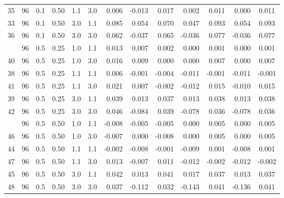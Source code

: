 \begin{longtable}[t]{ccccccrrrrrrc}
35 & 96 & 0.1 & 0.50 & 1.1 & 3.0 & 0.006 & -0.013 & 0.017 & 0.002 & 0.011 & 0.000 & 0.011\\
33 & 96 & 0.1 & 0.50 & 3.0 & 1.1 & 0.085 & 0.054 & 0.070 & 0.047 & 0.093 & 0.054 & 0.093\\
36 & 96 & 0.1 & 0.50 & 3.0 & 3.0 & 0.062 & -0.037 & 0.065 & -0.036 & 0.077 & -0.036 & 0.077\\
\addlinespace
37 & 96 & 0.5 & 0.25 & 1.0 & 1.1 & 0.013 & 0.007 & 0.002 & 0.000 & 0.001 & 0.000 & 0.001\\
40 & 96 & 0.5 & 0.25 & 1.0 & 3.0 & 0.016 & 0.009 & 0.000 & 0.000 & 0.007 & 0.000 & 0.007\\
38 & 96 & 0.5 & 0.25 & 1.1 & 1.1 & 0.006 & -0.001 & -0.004 & -0.011 & -0.001 & -0.011 & -0.001\\
41 & 96 & 0.5 & 0.25 & 1.1 & 3.0 & 0.021 & 0.007 & -0.002 & -0.012 & 0.015 & -0.010 & 0.015\\
39 & 96 & 0.5 & 0.25 & 3.0 & 1.1 & 0.039 & 0.013 & 0.037 & 0.013 & 0.038 & 0.013 & 0.038\\
42 & 96 & 0.5 & 0.25 & 3.0 & 3.0 & 0.046 & -0.084 & 0.039 & -0.078 & 0.036 & -0.078 & 0.036\\
\addlinespace
43 & 96 & 0.5 & 0.50 & 1.0 & 1.1 & -0.008 & -0.005 & -0.005 & 0.000 & 0.005 & 0.000 & 0.005\\
46 & 96 & 0.5 & 0.50 & 1.0 & 3.0 & -0.007 & 0.000 & -0.008 & 0.000 & 0.005 & 0.000 & 0.005\\
44 & 96 & 0.5 & 0.50 & 1.1 & 1.1 & -0.002 & -0.008 & -0.001 & -0.009 & 0.001 & -0.008 & 0.001\\
47 & 96 & 0.5 & 0.50 & 1.1 & 3.0 & 0.013 & -0.007 & 0.011 & -0.012 & -0.002 & -0.012 & -0.002\\
45 & 96 & 0.5 & 0.50 & 3.0 & 1.1 & 0.042 & 0.013 & 0.041 & 0.017 & 0.037 & 0.013 & 0.037\\
48 & 96 & 0.5 & 0.50 & 3.0 & 3.0 & 0.037 & -0.112 & 0.032 & -0.143 & 0.041 & -0.136 & 0.041\\
\bottomrule
\end{longtable}
\endgroup{}
